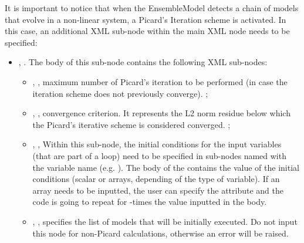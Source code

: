 It is important to notice that when the EnsembleModel detects a chain of models that evolve in a non-linear system, a Picard's Iteration scheme is activated. In this case, an additional XML sub-node within the main  XML node needs to be specified:
\begin{itemize}
  \item {}, .
  The body of this sub-node  contains the following XML sub-nodes:
  \begin{itemize}
     \item {}, ,
        maximum number of Picard's iteration to be performed (in case the iteration scheme does
        not previously converge). ;
     \item {}, ,
        convergence criterion. It represents the L2 norm residue below which the Picard's iterative scheme is
        considered converged. ;
     \item {}, ,
        Within this sub-node, the initial conditions for the input variables (that are part of a loop)  need to
        be specified in sub-nodes named with the variable name (e.g. ). The body of the
         contains the value of the initial conditions (scalar or arrays, depending of the
        type of variable). If an array needs to be inputted, the user can specify the attribute  
        and the code is going to repeat for  -times the value inputted in the body.
     \item {}, ,
        specifies the list of models that will be initially executed. \nb Do not input this node for non-Picard calculations,
        otherwise an error will be raised.
  \end{itemize}
\end{itemize}

